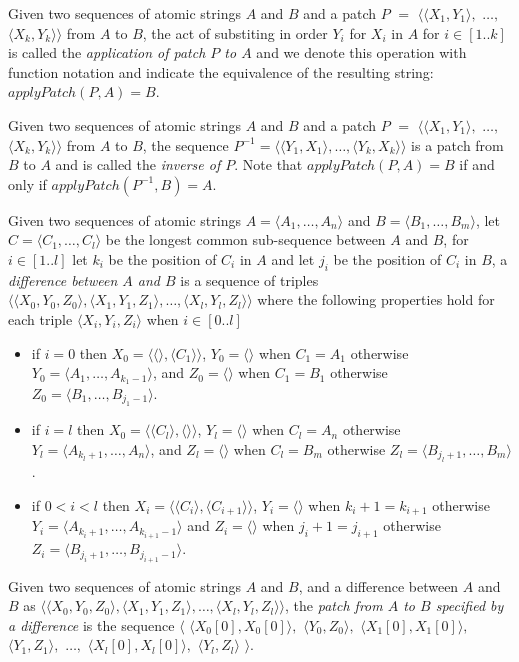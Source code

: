 \documentclass{article}
\newcommand{\nl}{\bigskip\noindent}
\newcommand{\seq}[1]{\langle #1\rangle}
\newcommand{\defcon}[1]{\emph{#1}}
\begin{document}
\nl Given two sequences of atomic strings $A$ and $B$ and a patch $P$ $=$ $\langle\seq{X_1,Y_1},$ $\dots,$ $\seq{X_k, Y_k}\rangle$ from $A$ to $B$, the act of substiting in order $Y_i$ for $X_i$ in $A$ for $i\in [1..k]$ is called the \defcon{application of patch $P$ to $A$} and we denote this operation with function notation and indicate the equivalence of the resulting string: $applyPatch(P,A) = B$.

\nl Given two sequences of atomic strings $A$ and $B$ and a patch $P$ $=$ $\langle\seq{X_1,Y_1},$ $\dots,$ $\seq{X_k, Y_k}\rangle$ from $A$ to $B$, the sequence $P^{-1} = \seq{\seq{Y_1,X_1}, \dots, \seq{Y_k, X_k}}$ is a patch from $B$ to $A$ and is called the \defcon{inverse of $P$}. Note that $applyPatch(P,A)= B$ if and only if $applyPatch(P^{-1}, B) = A$.


\nl Given two sequences of atomic strings $A = \seq{A_1,\dots, A_n}$ and $B = \seq{B_1,\dots, B_m}$, let $C = \seq{C_1,\dots, C_l}$ be the longest common sub-sequence between $A$ and $B$, for $i\in[1..l]$ let $k_i$ be the position of $C_i$ in $A$ and let $j_i$ be the position of $C_i$ in $B$, a \defcon{difference between $A$ and $B$} is a sequence of triples $\seq{\seq{X_0, Y_0,Z_0}, \seq{X_1,Y_1, Z_1}, \dots, \seq{X_l, Y_l, Z_l}}$ where the following properties hold for each triple  $\seq{X_i, Y_i, Z_i}$ when $i\in[0..l]$
\begin{itemize}
  \item if $i = 0$ then $X_0 = \seq{\seq{},\seq{C_1}}$, $Y_0 = \seq{}$  when $C_1 = A_1$ otherwise $Y_0 = \seq{A_1, \dots, A_{k_1 -1}}$, and  $Z_0 = \seq{}$ when $C_1 = B_1$ otherwise $Z_0 = \seq{B_1, \dots, B_{j_1-1}}$.
  \item if $i = l$ then $X_0 = \seq{\seq{C_l},\seq{}}$, $Y_l = \seq{}$  when $C_l = A_n$ otherwise $Y_l = \seq{A_{k_l +1}, \dots, A_n}$, and  $Z_l = \seq{}$ when $C_l = B_m$ otherwise $Z_l = \seq{B_{j_l+1}, \dots, B_m}$.
  \item if $0 < i < l$ then $X_i = \seq{\seq{C_i},\seq{C_{i+1}}}$, $Y_i = \seq{}$  when $k_i + 1 = k_{i+1}$ otherwise $Y_i = \seq{A_{k_i+1}, \dots, A_{k_{i+1}-1}}$ and $Z_i = \seq{}$ when $j_i+1 = j_{i+1}$ otherwise $Z_i = \seq{B_{j_i+1}, \dots, B_{j_{i+1}-1}}$.
\end{itemize}

\nl Given two sequences of atomic strings $A$ and $B$, and a difference between $A$ and $B$ as $\seq{\seq{X_0, Y_0,Z_0}, \seq{X_1,Y_1, Z_1}, \dots, \seq{X_l, Y_l, Z_l}}$, the \defcon{patch from $A$ to $B$ specified by a difference} is the sequence $\langle$ $\seq{X_0[0], X_0[0]},$  $\seq{Y_0,Z_0},$ $\seq{X_1[0], X_1[0]},$ $\seq{Y_1,Z_1},$ $\dots,$ $\seq{X_l[0], X_l[0]},$ $\seq{Y_l, Z_l}$ $\rangle$.  
\end{document}
